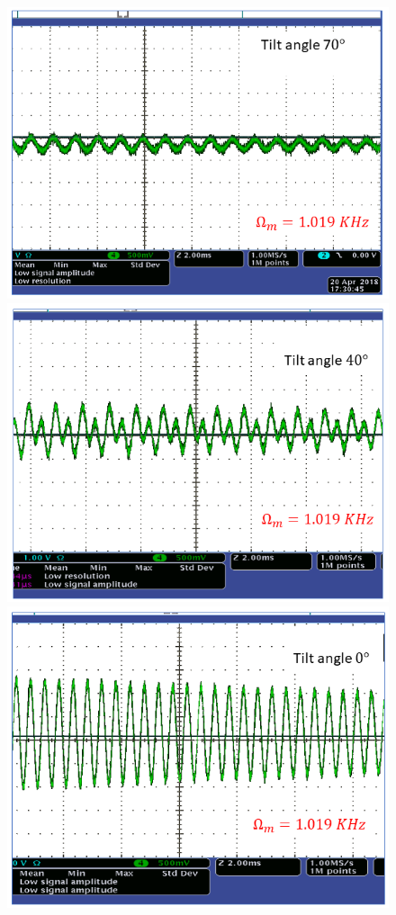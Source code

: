 \begin{figure}
  \centering
\includegraphics[width=\textwidth,trim={0cm 5.7cm 4.1cm 4.3cm},clip]{figures/tilt3}
 \includegraphics[width=\textwidth,trim={0cm 5cm 0cm 3.5cm},clip]{figures/tilt2}
  \includegraphics[width=\textwidth,trim={0.4cm 4.5cm 1.7cm 3cm},clip]{figures/tilt1}

\end{figure}
